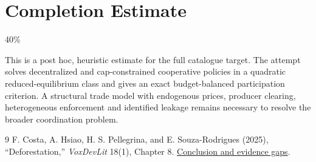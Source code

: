 \documentclass[11pt]{article}
\theoremstyle{definition}
\begin{document}
\section{Completion Estimate}
40\%

This is a post hoc, heuristic estimate for the full catalogue target.
The attempt solves decentralized and cap-constrained cooperative policies in a quadratic reduced-equilibrium class and gives an exact budget-balanced participation criterion. A structural trade model with endogenous prices, producer clearing, heterogeneous enforcement and identified leakage remains necessary to resolve the broader coordination problem.

\begin{thebibliography}{9}
 F. Costa, A. Hsiao, H. S. Pellegrina, and E. Souza-Rodrigues (2025), ``Deforestation,'' \emph{VoxDevLit} 18(1), Chapter 8. \href{https://www.voxdev.org/voxdevlit/deforestation/conclusion-and-evidence-gaps}{Conclusion and evidence gaps}.
\end{thebibliography}
\end{document}
